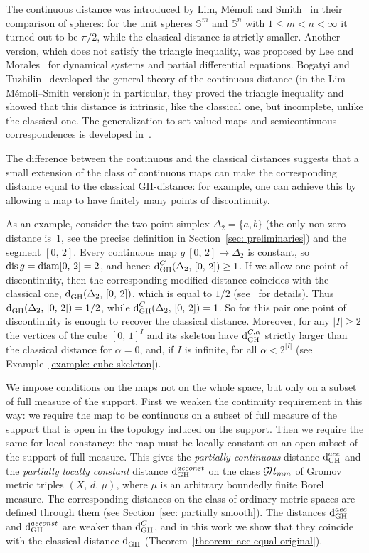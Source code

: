 The continuous distance was introduced by Lim, M\'emoli and Smith~\cite{LimMemoliSmith} in their comparison of spheres: for the unit spheres $\mathbb{S}^m$ and $\mathbb{S}^n$ with $1 \leq m < n < \infty$ it turned out to be $\pi/2$, while the classical distance is strictly smaller.
Another version, which does not satisfy the triangle inequality, was proposed by Lee and Morales~\cite{LeeMorales2022} for dynamical systems and partial differential equations.
Bogatyi and Tuzhilin~\cite{TuzCont} developed the general theory of the continuous distance (in the Lim--M\'emoli--Smith version): in particular, they proved the triangle inequality and showed that this distance is intrinsic, like the classical one, but incomplete, unlike the classical one.
The generalization to set-valued maps and semicontinuous correspondences is developed in~\cite{SemenovTuzhContGH}.

The difference between the continuous and the classical distances suggests that a small extension of the class of continuous maps can make the corresponding distance equal to the classical GH-distance: for example, one can achieve this by allowing a map to have finitely many points of discontinuity.

As an example, consider the two-point simplex $\Delta_2 = \{a, b\}$ (the only non-zero distance is~1, see the precise definition in Section~\ref{sec: preliminaries}) and the segment $[0,\, 2]$.
Every continuous map $g\: [0,\, 2] \to \Delta_2$ is constant, so $\operatorname{dis} g = \operatorname{diam}[0,\, 2] = 2$, and hence $\operatorname{d}^{C}_{\mathrm{GH}}(\Delta_2,\, [0,\, 2]) \geq 1$.
If we allow one point of discontinuity, then the corresponding modified distance coincides with the classical one, $\operatorname{d}^{}_{\mathrm{GH}}(\Delta_2,\, [0,\, 2])$, which is equal to $1/2$ (see~\cite[Thm.~2.12]{GrigorIvanTuzSimplex} for details).
Thus $\operatorname{d}^{}_{\mathrm{GH}}(\Delta_2,\, [0,\, 2]) = 1/2$, while $\operatorname{d}^{C}_{\mathrm{GH}}(\Delta_2,\, [0,\, 2]) = 1$.
So for this pair one point of discontinuity is enough to recover the classical distance.
Moreover, for any $|I| \ge 2$ the vertices of the cube ${[0,\, 1]}^I$ and its skeleton have $\operatorname{d}^{C, \alpha}_{\mathrm{GH}}$ strictly larger than the classical distance for $\alpha = 0$, and, if $I$ is infinite, for all $\alpha < 2^{|I|}$ (see Example~\ref{example: cube skeleton}).

We impose conditions on the maps not on the whole space, but only on a subset of full measure of the support.
First we weaken the continuity requirement in this way: we require the map to be continuous on a subset of full measure of the support that is open in the topology induced on the support.
Then we require the same for local constancy: the map must be locally constant on an open subset of the support of full measure.
This gives the \emph{partially continuous} distance $\operatorname{d}^{aec}_{\mathrm{GH}}$ and the \emph{partially locally constant} distance $\operatorname{d}^{aeconst}_{\mathrm{GH}}$ on the class $\operatorname{\mathcal{G\!H}}_{mm}$ of Gromov metric triples $(X,\, d,\, \mu)$, where $\mu$ is an arbitrary boundedly finite Borel measure. The corresponding distances on the class of ordinary metric spaces are defined through them (see Section~\ref{sec: partially smooth}).
The distances $\operatorname{d}^{aec}_{\mathrm{GH}}$ and $\operatorname{d}^{aeconst}_{\mathrm{GH}}$ are weaker than $\operatorname{d}^{C}_{\mathrm{GH}}$, and in this work we show that they coincide with the classical distance $\operatorname{d}^{}_{\mathrm{GH}}$ (Theorem~\ref{theorem: aec equal original}).

